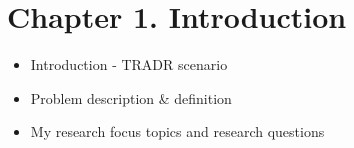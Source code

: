 \chapter{Chapter 1. Introduction}
\begin{itemize}
\item Introduction - TRADR scenario
\item Problem description & definition 
\item My research focus topics and research questions
\end{itemize}

    
    
    